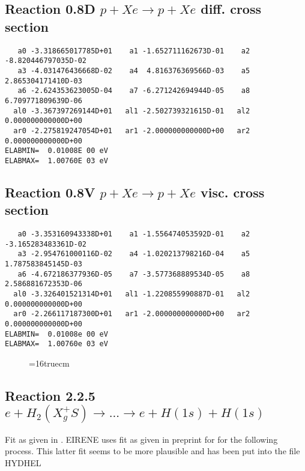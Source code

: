 \documentclass[12pt]{article}
\begin{document}
\subsection{
Reaction 0.8D    $p + Xe \rightarrow p + Xe  $ diff. cross
section }


\begin{small}\begin{verbatim}
   a0 -3.318665017785D+01    a1 -1.652711162673D-01    a2 -8.820446797035D-02
   a3 -4.031476436668D-02    a4  4.816376369566D-03    a5  2.865304171410D-03
   a6 -2.624353623005D-04    a7 -6.271242694944D-05    a8  6.709771809639D-06
  al0 -3.367397269144D+01   al1 -2.502739321615D-01   al2  0.000000000000D+00
  ar0 -2.275819247054D+01   ar1 -2.000000000000D+00   ar2  0.000000000000D+00
ELABMIN=  0.01008E 00 eV
ELABMAX=  1.00760E 03 eV
\end{verbatim}\end{small}

\subsection{
Reaction 0.8V   $ p + Xe \rightarrow p + Xe  $ visc. cross
section }


\begin{small}\begin{verbatim}
   a0 -3.353160943338D+01    a1 -1.556474053592D-01    a2 -3.165283483361D-02
   a3 -2.954761000116D-02    a4 -1.020213798216D-04    a5  1.787583845145D-03
   a6 -4.672186377936D-05    a7 -3.577368889534D-05    a8  2.586881672353D-06
  al0 -3.326401521314D+01   al1 -1.220855990887D-01   al2  0.000000000000D+00
  ar0 -2.266117187300D+01   ar1 -2.000000000000D+00   ar2  0.000000000000D+00
ELABMIN=  0.01008e 00 eV
ELABMAX=  1.00760e 03 eV
\end{verbatim}\end{small}


\begin{figure} \label{0.8}
\epsfxsize=16truecm
\end{figure}
\newpage

\subsection{
Reaction 2.2.5
$ e + H_2 (X_g^+ S ) \rightarrow . . . \rightarrow e + H(1s) + H(1s) $ }

Fit as given in \cite{kn:Janev}.
 EIRENE uses fit as given in preprint for
\cite{kn:Janev}
for the following process.
This latter fit seems to be more plausible  and has been put
into the file HYDHEL
\end{document}
